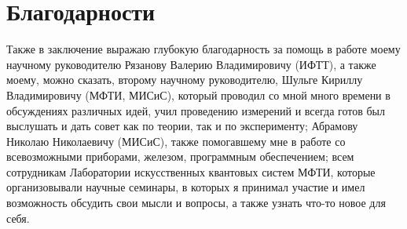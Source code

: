\documentclass[12pt, twoside]{report}
\numberwithin{equation}{section}
\numberwithin{figure}{section}
\begin{document}
\section{Благодарности}

Также в заключение выражаю глубокую благодарность за помощь в работе моему научному руководителю Рязанову Валерию Владимировичу (ИФТТ), а также моему, можно сказать, второму научному руководителю, Шульге Кириллу Владимировичу (МФТИ, МИСиС), который проводил со мной много времени в обсуждениях различных идей, учил проведению измерений и всегда готов был выслушать и дать совет как по теории, так и по эксперименту; Абрамову Николаю Николаевичу (МИСиС), также помогавшему мне в работе со всевозможными приборами, железом, программным обеспечением; всем сотрудникам Лаборатории искусственных квантовых систем МФТИ, которые организовывали научные семинары, в которых я принимал участие и имел возможность обсудить свои мысли и вопросы, а также узнать что-то новое для себя.

\hypersetup{hidelinks=true}
\fi



\end{document}
